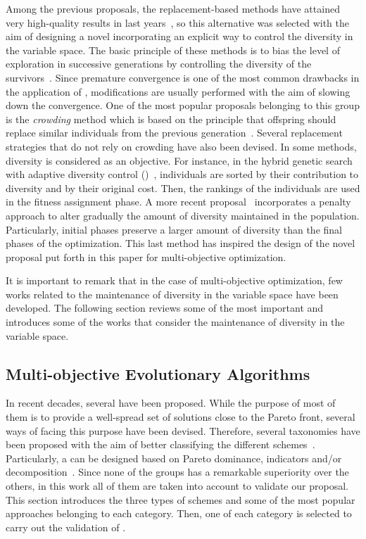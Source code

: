 Among the previous proposals, the replacement-based methods have attained very high-quality results in last years~\cite{Segura:17}, so
this alternative was selected with the aim of designing a novel \MOEA{} incorporating an explicit way to control the diversity 
in the variable space.
%
The basic principle of these methods is to bias the level of exploration in successive generations by 
controlling the diversity of the survivors~\cite{Segura:17}.
%
Since premature convergence is one of the most common drawbacks in the application of \EAS{}, 
modifications are usually performed with the aim of slowing down the convergence.
%
One of the most popular proposals belonging to this group is the \textit{crowding} method which
is based on the principle that offspring should replace similar individuals from the previous generation~\cite{Mengshoel:14}.
%
Several replacement strategies that do not rely on crowding have also been devised.
%
In some methods, diversity is considered as an objective.
%
For instance, in the hybrid genetic search with adaptive diversity control (\HGSADC{})~\cite{Vidal:13}, individuals are sorted 
by their contribution to diversity and by their original cost.
%
Then, the rankings of the individuals are used in the fitness assignment phase.
%
A more recent proposal~\cite{Segura:17} incorporates a penalty approach to alter gradually the amount of diversity 
maintained in the population.
%
Particularly, initial phases preserve a larger amount of diversity than the final phases of the optimization.
%
This last method has inspired the design of the novel proposal put forth in this paper for multi-objective optimization.
%

It is important to remark that in the case of multi-objective optimization, few works related to the maintenance of 
diversity in the variable space have been developed.
%
The following section reviews some of the most important \MOEAS{} and introduces some of the works that consider
the maintenance of diversity in the variable space.

\subsection{Multi-objective Evolutionary Algorithms}

In recent decades, several \MOEAS{} have been proposed. 
%
While the purpose of most of them is to provide a well-spread set of solutions close to the Pareto front,
several ways of facing this purpose have been devised.
%
Therefore, several taxonomies have been proposed with the aim of better classifying the different 
schemes~\cite{Joel:BOOK_MOEAs}.
%
Particularly, a \MOEA{} can be designed based on Pareto dominance, indicators and/or decomposition~\cite{Joel:StateArt}.
%
Since none of the groups has a remarkable superiority over the others, in this work all of them are taken into account to validate
our proposal.
%
This section introduces the three types of schemes and some of the most popular approaches belonging to each category.
%
Then, one \MOEA{} of each category is selected to carry out the validation of \VSDMOEA{}.

